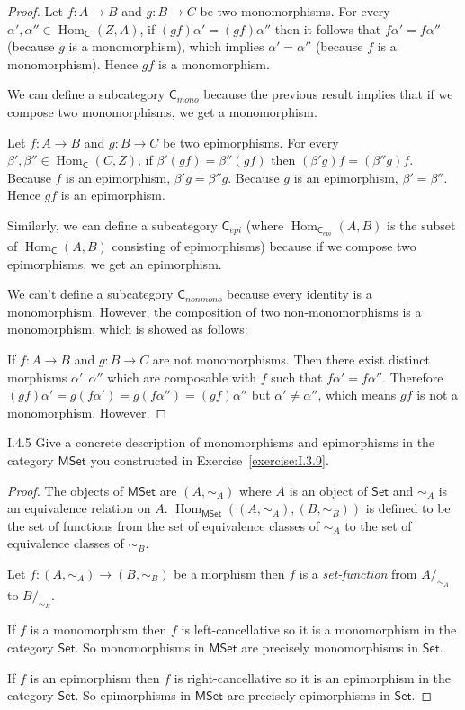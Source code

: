 \begin{proof}
	Let $f: A\to B$ and $g: B\to C$ be two monomorphisms. For every $\alpha', \alpha'' \in \operatorname{Hom}_{\mathsf{C}}(Z, A)$, if $(gf)\alpha' = (gf)\alpha''$ then it follows that $f\alpha' = f\alpha''$ (because $g$ is a monomorphism), which implies $\alpha' = \alpha''$ (because $f$ is a monomorphism). Hence $gf$ is a monomorphism.

	We can define a subcategory $\mathsf{C}_{mono}$ because the previous result implies that if we compose two monomorphisms, we get a monomorphism.

	Let $f: A\to B$ and $g: B\to C$ be two epimorphisms. For every $\beta', \beta'' \in \operatorname{Hom}_{\mathsf{C}}(C, Z)$, if $\beta'(gf) = \beta''(gf)$ then $(\beta'g)f = (\beta''g)f$. Because $f$ is an epimorphism, $\beta'g = \beta''g$. Because $g$ is an epimorphism, $\beta' = \beta''$. Hence $gf$ is an epimorphism.

	Similarly, we can define a subcategory $\mathsf{C}_{epi}$ (where $\operatorname{Hom}_{{\mathsf{C}}_{epi}}(A, B)$ is the subset of $\operatorname{Hom}_{\mathsf{C}}(A, B)$ consisting of epimorphisms) because if we compose two epimorphisms, we get an epimorphism.

	We can't define a subcategory $\mathsf{C}_{nonmono}$ because every identity is a monomorphism. However, the composition of two non-monomorphisms is a monomorphism, which is showed as follows:

	If $f: A\to B$ and $g: B\to C$ are not monomorphisms. Then there exist distinct morphisms $\alpha', \alpha''$ which are composable with $f$ such that $f\alpha' = f\alpha''$. Therefore $(gf)\alpha' = g(f\alpha') = g(f\alpha'') = (gf)\alpha''$ but $\alpha' \ne \alpha''$, which means $gf$ is not a monomorphism. However,
\end{proof}

\begin{exercise}{I.4.5}
	Give a concrete description of monomorphisms and epimorphisms in the category $\mathsf{MSet}$ you constructed in Exercise~\ref{exercise:I.3.9}.
\end{exercise}

\begin{proof}
	The objects of $\mathsf{MSet}$ are $(A, \sim_{A})$ where $A$ is an object of $\mathsf{Set}$ and $\sim_{A}$ is an equivalence relation on $A$. $\operatorname{Hom}_{\mathsf{MSet}}((A, \sim_{A}), (B, \sim_{B}))$ is defined to be the set of functions from the set of equivalence classes of $\sim_{A}$ to the set of equivalence classes of $\sim_{B}$.

	Let $f: (A, \sim_{A})\to (B, \sim_{B})$ be a morphism then $f$ is a \textit{set-function} from $A/_{\sim_{A}}$ to $B/_{\sim_{B}}$.

	If $f$ is a monomorphism then $f$ is left-cancellative so it is a monomorphism in the category $\mathsf{Set}$. So monomorphisms in $\mathsf{MSet}$ are precisely monomorphisms in $\mathsf{Set}$.

	If $f$ is an epimorphism then $f$ is right-cancellative so it is an epimorphism in the category $\mathsf{Set}$. So epimorphisms in $\mathsf{MSet}$ are precisely epimorphisms in $\mathsf{Set}$.
\end{proof}

